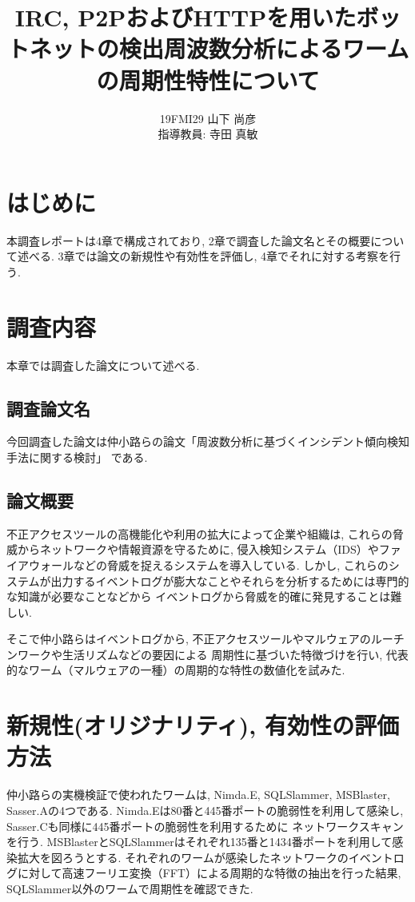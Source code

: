 \documentclass[twocolumn,9]{ltjsarticle}
\title{IRC, P2PおよびHTTPを用いたボットネットの検出}
\title{周波数分析によるワームの周期性特性について}
\author{19FMI29 山下 尚彦 \\ 指導教員: 寺田 真敏}
\date{}
\begin{document}
\maketitle

\section{はじめに}
本調査レポートは4章で構成されており, 2章で調査した論文名とその概要について述べる. 
3章では論文の新規性や有効性を評価し, 4章でそれに対する考察を行う. 

\section{調査内容}
本章では調査した論文について述べる. 

\subsection{調査論文名}
今回調査した論文は仲小路らの論文「周波数分析に基づくインシデント傾向検知手法に関する検討」
\cite{仲小路博史2005周波数分析に基づくインシデント傾向検知手法に関する検討}である. 

\subsection{論文概要}
不正アクセスツールの高機能化や利用の拡大によって企業や組織は, これらの脅威からネットワークや情報資源を守るために, 
侵入検知システム（IDS）やファイアウォールなどの脅威を捉えるシステムを導入している. 
しかし, これらのシステムが出力するイベントログが膨大なことやそれらを分析するためには専門的な知識が必要なことなどから
イベントログから脅威を的確に発見することは難しい. 

そこで仲小路らはイベントログから, 不正アクセスツールやマルウェアのルーチンワークや生活リズムなどの要因による
周期性に基づいた特徴づけを行い, 代表的なワーム（マルウェアの一種）の周期的な特性の数値化を試みた. 

\section{新規性(オリジナリティ), 有効性の評価方法}
仲小路らの実機検証で使われたワームは, Nimda.E, SQLSlammer, MSBlaster, Sasser.Aの4つである. 
Nimda.Eは80番と445番ポートの脆弱性を利用して感染し, Sasser.Cも同様に445番ポートの脆弱性を利用するために
ネットワークスキャンを行う. MSBlasterとSQLSlammerはそれぞれ135番と1434番ポートを利用して感染拡大を図ろうとする. 
それぞれのワームが感染したネットワークのイベントログに対して高速フーリエ変換（FFT）による周期的な特徴の抽出を行った結果, 
SQLSlammer以外のワームで周期性を確認できた. 
\end{document}

